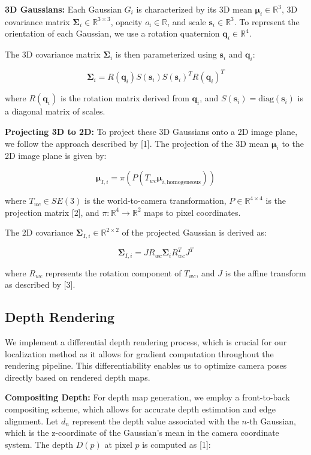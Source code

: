 \documentclass[twocolumn]{article} %
\begin{document}
\textbf{3D Gaussians:} Each Gaussian \(G_i\) is characterized by its 3D
mean \(\boldsymbol{\mu}_i \in \mathbb{R}^3\), 3D covariance matrix
\(\boldsymbol{\Sigma}_i \in \mathbb{R}^{3\times3}\), opacity
\(o_i \in \mathbb{R}\), and scale \(\mathbf{s}_i \in \mathbb{R}^3\). To
represent the orientation of each Gaussian, we use a rotation quaternion
\(\mathbf{q}_i \in \mathbb{R}^4\).

The 3D covariance matrix \(\boldsymbol{\Sigma}_i\) is then parameterized
using \(\mathbf{s}_i\) and \(\mathbf{q}_i\):

\[\boldsymbol{\Sigma}_i = R(\mathbf{q}_i) S(\mathbf{s}_i) S(\mathbf{s}_i)^T R(\mathbf{q}_i)^T\]

where \(R(\mathbf{q}_i)\) is the rotation matrix derived from
\(\mathbf{q}_i\), and \(S(\mathbf{s}_i) = \text{diag}(\mathbf{s}_i)\) is
a diagonal matrix of scales.

\textbf{Projecting 3D to 2D:} To project these 3D Gaussians onto a 2D
image plane, we follow the approach described by {[}1{]}. The projection
of the 3D mean \(\boldsymbol{\mu}_i\) to the 2D image plane is given by:

\[\boldsymbol{\mu}_{I,i} = \pi(P(T_{wc} \boldsymbol{\mu}_{i,\text{homogeneous}}))\]

where \(T_{wc} \in SE(3)\) is the world-to-camera transformation,
\(P \in \mathbb{R}^{4 \times 4}\) is the projection matrix {[}2{]}, and
\(\pi: \mathbb{R}^4 \rightarrow \mathbb{R}^2\) maps to pixel
coordinates.

The 2D covariance
\(\boldsymbol{\Sigma}_{I,i} \in \mathbb{R}^{2\times2}\) of the projected
Gaussian is derived as:

\[\boldsymbol{\Sigma}_{I,i} = J R_{wc} \boldsymbol{\Sigma}_i R_{wc}^T J^T\]

where \(R_{wc}\) represents the rotation component of \(T_{wc}\), and
\(J\) is the affine transform as described by {[}3{]}.

\subsection{Depth Rendering}\label{depth-rendering}

We implement a differential depth rendering process, which is crucial
for our localization method as it allows for gradient computation
throughout the rendering pipeline. This differentiability enables us to
optimize camera poses directly based on rendered depth maps.

\textbf{Compositing Depth:} For depth map generation, we employ a
front-to-back compositing scheme, which allows for accurate depth
estimation and edge alignment. Let \(d_n\) represent the depth value
associated with the \(n\)-th Gaussian, which is the z-coordinate of the
Gaussian's mean in the camera coordinate system. The depth \(D(p)\) at
pixel \(p\) is computed as {[}1{]}:
\end{document}
